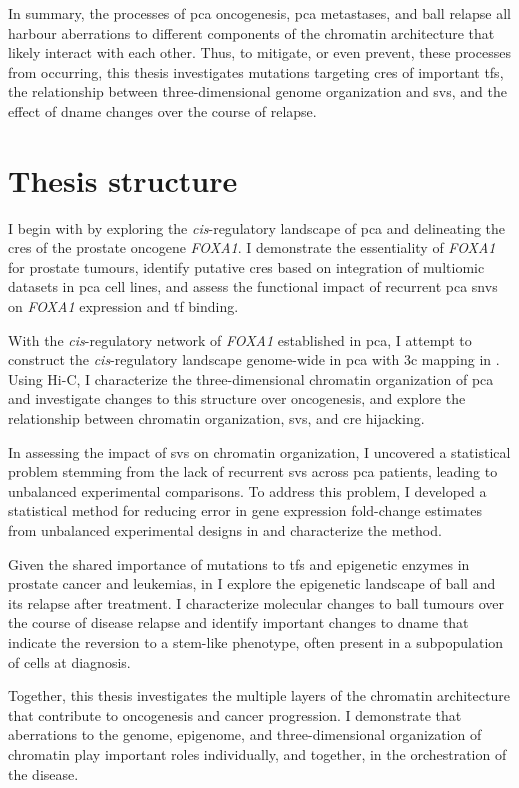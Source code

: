 In summary, the processes of \gls{pca} oncogenesis, \gls{pca} metastases, and \gls{ball} relapse all harbour aberrations to different components of the chromatin architecture that likely interact with each other.
Thus, to mitigate, or even prevent, these processes from occurring, this thesis investigates mutations targeting \glspl{cre} of important \glspl{tf}, the relationship between three-dimensional genome organization and \glspl{sv}, and the effect of \gls{dname} changes over the course of relapse.

\section{Thesis structure}

I begin with  by exploring the \emph{cis}-regulatory landscape of \gls{pca} and delineating the \glspl{cre} of the prostate oncogene \emph{FOXA1}.
I demonstrate the essentiality of \emph{FOXA1} for prostate tumours, identify putative \glspl{cre} based on integration of multiomic datasets in \gls{pca} cell lines, and assess the functional impact of recurrent \gls{pca} \glspl{snv} on \emph{FOXA1} expression and \gls{tf} binding.

With the \emph{cis}-regulatory network of \emph{FOXA1} established in \gls{pca}, I attempt to construct the \emph{cis}-regulatory landscape genome-wide in \gls{pca} with \gls{3c} mapping in .
Using Hi-C, I characterize the three-dimensional chromatin organization of \gls{pca} and investigate changes to this structure over oncogenesis, and explore the relationship between chromatin organization, \glspl{sv}, and \gls{cre} hijacking.

In assessing the impact of \glspl{sv} on chromatin organization, I uncovered a statistical problem stemming from the lack of recurrent \glspl{sv} across \gls{pca} patients, leading to unbalanced experimental comparisons.
To address this problem, I developed a statistical method for reducing error in gene expression fold-change estimates from unbalanced experimental designs in  and characterize the method.

Given the shared importance of mutations to \glspl{tf} and epigenetic enzymes in prostate cancer and leukemias, in  I explore the epigenetic landscape of \gls{ball} and its relapse after treatment.
I characterize molecular changes to \gls{ball} tumours over the course of disease relapse and identify important changes to \gls{dname} that indicate the reversion to a stem-like phenotype, often present in a subpopulation of cells at diagnosis.

Together, this thesis investigates the multiple layers of the chromatin architecture that contribute to oncogenesis and cancer progression.
I demonstrate that aberrations to the genome, epigenome, and three-dimensional organization of chromatin play important roles individually, and together, in the orchestration of the disease.
